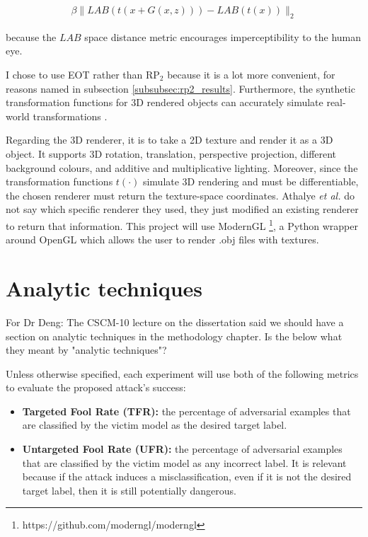 \begin{equation}
    \begin{aligned}
    \beta\|LAB(t(x + G(x,z))) - LAB(t(x))\|_2
    \end{aligned}
\end{equation}

\noindent because the $LAB$ space distance metric encourages imperceptibility to the human eye.

I chose to use EOT \cite{athalye} rather than $\textrm{RP}_2$ \cite{evtimov_road_signs} because it is a lot more convenient, for reasons named in subsection \ref{subsubsec:rp2_results}. Furthermore, the synthetic transformation functions for 3D rendered objects can accurately simulate real-world transformations \cite{athalye}.

Regarding the 3D renderer, it is to take a 2D texture and render it as a 3D object. It supports 3D rotation, translation, perspective projection, different background colours, and additive and multiplicative lighting. Moreover, since the transformation functions $t(\cdot)$ simulate 3D rendering and must be differentiable, the chosen renderer must return the texture-space coordinates. Athalye \textit{et al.} \cite{athalye} do not say which specific renderer they used, they just modified an existing renderer to return that information. This project will use ModernGL \footnote{https://github.com/moderngl/moderngl}, a Python wrapper around OpenGL which allows the user to render .obj files with textures.

\section{Analytic techniques}
    \label{sec:analytic_techniques}
    
For Dr Deng: The CSCM-10 lecture on the dissertation said we should have a section on analytic techniques in the methodology chapter. Is the below what they meant by "analytic techniques"?
    
Unless otherwise specified, each experiment will use both of the following metrics to evaluate the proposed attack's success:

\begin{itemize}
    \item \textbf{Targeted Fool Rate (TFR):} the percentage of adversarial examples that are classified by the victim model as the desired target label.
    \item \textbf{Untargeted Fool Rate (UFR):} the percentage of adversarial examples that are classified by the victim model as any incorrect label. It is relevant because if the attack induces a misclassification, even if it is not the desired target label, then it is still potentially dangerous.
\end{itemize}

